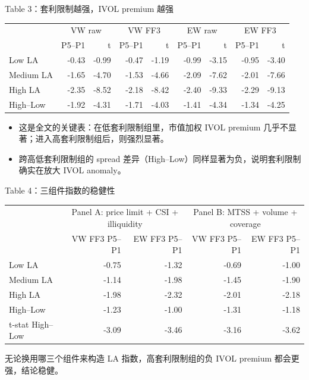 \documentclass[aspectratio=169,10pt]{beamer}
\newcommand{\tinytab}{\tiny\setlength{\tabcolsep}{2.2pt}\renewcommand{\arraystretch}{1.08}}
\begin{document}
\begin{frame}{Table 3：套利限制越强，IVOL premium 越强}
	\tinytab
	\begin{tabular}{lrrrrrrrr}
		\toprule
		& \multicolumn{2}{c}{VW raw} & \multicolumn{2}{c}{VW FF3} & \multicolumn{2}{c}{EW raw} & \multicolumn{2}{c}{EW FF3}\\
		& P5--P1 & t & P5--P1 & t & P5--P1 & t & P5--P1 & t\\
		\midrule
		Low LA & -0.43 & -0.99 & -0.47 & -1.19 & -0.99 & -3.15 & -0.95 & -3.40\\
		Medium LA & -1.65 & -4.70 & -1.53 & -4.66 & -2.09 & -7.62 & -2.01 & -7.66\\
		High LA & -2.35 & -8.52 & -2.18 & -8.42 & -2.40 & -9.33 & -2.29 & -9.13\\
		High--Low & -1.92 & -4.31 & -1.71 & -4.03 & -1.41 & -4.34 & -1.34 & -4.25\\
		\bottomrule
	\end{tabular}
	\vspace{5pt}
	\begin{itemize}
		\item 这是全文的关键表：在低套利限制组里，市值加权 IVOL premium 几乎不显著；进入高套利限制组后，则强烈显著。
		\item 跨高低套利限制组的 spread 差异（High--Low）同样显著为负，说明套利限制确实在放大 IVOL anomaly。
	\end{itemize}
\end{frame}

\begin{frame}{Table 4：三组件指数的稳健性}
	\tinytab
	\begin{tabular}{lrrrr}
		\toprule
		& \multicolumn{2}{c}{Panel A: price limit + CSI + illiquidity} & \multicolumn{2}{c}{Panel B: MTSS + volume + coverage}\\
		& VW FF3 P5--P1 & EW FF3 P5--P1 & VW FF3 P5--P1 & EW FF3 P5--P1\\
		\midrule
		Low LA & -0.75 & -1.32 & -0.69 & -1.00\\
		Medium LA & -1.14 & -1.98 & -1.45 & -1.90\\
		High LA & -1.98 & -2.32 & -2.01 & -2.18\\
		High--Low & -1.23 & -1.00 & -1.31 & -1.18\\
		t-stat High--Low & -3.09 & -3.46 & -3.16 & -3.62\\
		\bottomrule
	\end{tabular}
	\par\vspace{5pt}
	\small 无论换用哪三个组件来构造 LA 指数，高套利限制组的负 IVOL premium 都会更强，结论稳健。
\end{frame}
\end{document}
